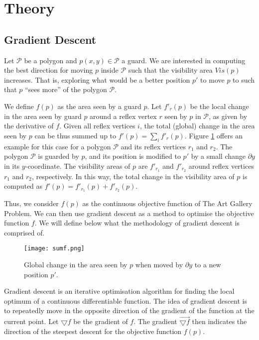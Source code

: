 \section{Theory}


\subsection{Gradient Descent}

Let $\mathcal P$ be a polygon and $p(x, y) \in \mathcal P$ a guard. We are interested in computing the best direction for moving $p$ inside $\mathcal P$ such that the visibility area $Vis(p)$ increases. That is, exploring what would be a better position $p'$ to move $p$ to such that $p$ ``sees more'' of the polygon $\mathcal P$. 

We define $f(p)$ as the area seen by a guard $p$. Let $f'_r(p)$ be the local change in the area seen by guard $p$ around a reflex vertex $r$ seen by $p$ in $\mathcal P$, as given by the derivative of $f$. Given all reflex vertices $i$, the total (global) change in the area seen by $p$ can be thus summed up to $f'(p) = \sum_i f'_r(p)$. Figure \ref{fig:sumf} offers an example for this case for a polygon $\mathcal P$ and its reflex vertices $r_1$ and $r_2$. The polygon $\mathcal P$ is guarded by $p$, and its position is modified to $p'$ by a small change $\partial y$ in its $y$-coordinate. The visibility areas of $p$ are $f'_{r_1}$ and $f'_{r_2}$ around reflex vertices $r_1$ and $r_2$, respectively. In this way, the total change in the visibility area of $p$ is computed as $f'(p) = f'_{r_1}(p) + f'_{r_2}(p)$.

Thus, we consider $f(p)$ as the continuous objective function of The Art Gallery Problem. We can then use gradient descent as a method to optimise the objective function $f$. We will define below what the methodology of gradient descent is comprised of.

\begin{figure}[h!]
    \centering
    \texttt{[image: sumf.png]}
    \caption{Global change in the area seen by $p$ when moved by $\partial y$ to a new position $p'$.}
    \label{fig:sumf}
\end{figure}


Gradient descent is an iterative optimisation algorithm for finding the local optimum of a continuous differentiable function. The idea of gradient descent is to repeatedly move in the opposite direction of the gradient of the function at the current point. Let $\bigtriangledown f$ be the gradient of $f$. The gradient $\vec{\bigtriangledown f}$ then indicates the direction of the steepest descent for the objective function $f(p)$.

